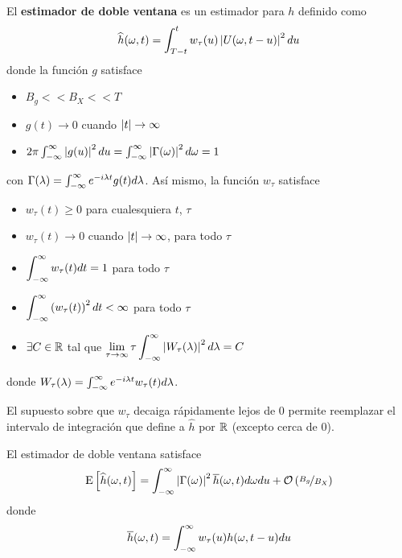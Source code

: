 \begin{definicion}
El \textbf{estimador de doble ventana} es un estimador para $h$ definido como
\begin{equation}
\widehat{h}(\omega, t) = \int_{T-t}^{t} w_\tau (u) \left| U(\omega,t-u) \right|^{2} du
\end{equation}
donde la función $g$ satisface
\begin{itemize}
\item $B_g << B_X << T$
\item $g(t) \rightarrow 0$ cuando $\left| t \right| \rightarrow \infty$
\item $2\pi \int_{-\infty}^{\infty} \left| g(u) \right|^{2} du = \int_{-\infty}^{\infty} \left| \Gamma(\omega) \right|^{2} d\omega = 1$
\end{itemize}
con $\Gamma(\lambda) = \int_{-\infty}^{\infty} e^{-i \lambda t} g(t) d\lambda$. Así mismo, la función $w_\tau$ satisface
\begin{itemize}
\item $w_\tau(t) \geq 0$ para cualesquiera $t$, $\tau$
\item $w_\tau(t) \rightarrow 0$ cuando $\left| t \right| \rightarrow \infty$, para todo $\tau$
\item $\displaystyle \int_{-\infty}^{\infty} w_\tau(t) dt = 1$ para todo $\tau$
\item $\displaystyle \int_{-\infty}^{\infty} \left( w_\tau(t) \right)^{2} dt < \infty$ para todo $\tau$
\item $\exists C \in \mathbb{R}$ tal que  
$\displaystyle \lim_{\tau\rightarrow\infty} \tau \int_{-\infty}^{\infty} \left|  W_{\tau}(\lambda)  \right|^{2} d\lambda = C$
\end{itemize}
donde $W_\tau(\lambda) = \int_{-\infty}^{\infty} e^{-i \lambda t} w_\tau(t) d\lambda$.
\label{estimador_doble_ventana}
\end{definicion}

El supuesto sobre que $w_\tau$ decaiga rápidamente lejos de 0 permite reemplazar el intervalo de integración que define a $\widehat{h}$ por $\mathbb{R}$ (excepto cerca de 0). 

\begin{proposicion}
El estimador de doble ventana satisface
\begin{equation}
\mathrm{E}\left[ \widehat{h}(\omega, t) \right] = \int_{-\infty}^{\infty} \left| \Gamma(\omega) \right|^{2} \overline{h}(\omega,t) d\omega du +
\mathcal{O}\left( \nicefrac{B_g}{B_X} \right)
\end{equation}
donde
\begin{equation}
\overline{h}(\omega,t) = \int_{-\infty}^{\infty} w_\tau (u) h(\omega, t-u) du
\end{equation}
\end{proposicion}

